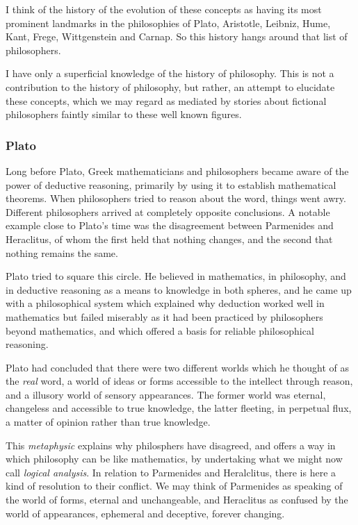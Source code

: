 \documentclass[10pt,titlepage]{article}
\begin{document}
I think of the history of the evolution of these concepts as having its most prominent landmarks in the philosophies of Plato, Aristotle, Leibniz, Hume, Kant, Frege, Wittgenstein and Carnap.
So this history hangs around that list of philosophers.

I have only a superficial knowledge of the history of philosophy.
This is not a contribution to the history of philosophy, but rather, an attempt to elucidate these concepts, which we may regard as mediated by stories about fictional philosophers faintly similar to these well known figures.

\subsubsection{Plato}

Long before Plato, Greek mathematicians and philosophers became aware of the power of deductive reasoning, primarily by using it to establish mathematical theorems.
When philosophers tried to reason about the word, things went awry.
Different philosophers arrived at completely opposite conclusions.
A notable example close to Plato's time was the disagreement between Parmenides and Heraclitus, of whom the first held that nothing changes, and the second that nothing remains the same.

Plato tried to square this circle.
He believed in mathematics, in philosophy, and in deductive reasoning as a means to knowledge in both spheres, and he came up with a philosophical system which explained why deduction worked well in mathematics but failed miserably as it had been practiced by philosophers beyond mathematics, and which offered a basis for reliable philosophical reasoning.

Plato had concluded that there were two different worlds which he thought of as the \emph{real} word, a world of ideas or forms accessible to the intellect through reason, and a illusory world of sensory appearances.
The former world was eternal, changeless and accessible to true knowledge, the latter fleeting, in perpetual flux, a matter of opinion rather than true knowledge.

This \emph{metaphysic} explains why philosphers have disagreed, and offers a way in which philosophy can be like mathematics, by undertaking what we might now call \emph{logical analysis}.
In relation to Parmenides and Heralclitus, there is here a kind of resolution to their conflict.
We may think of Parmenides as speaking of the world of forms, eternal and unchangeable, and Heraclitus as confused by the world of appearances, ephemeral and deceptive, forever changing.
\end{document}
